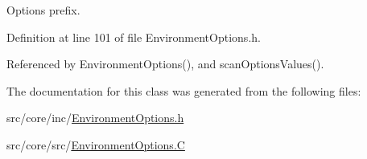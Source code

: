 Options prefix. 



Definition at line 101 of file Environment\-Options.\-h.



Referenced by Environment\-Options(), and scan\-Options\-Values().



The documentation for this class was generated from the following files\-:\begin{DoxyCompactItemize}
\item 
src/core/inc/\hyperlink{_environment_options_8h}{Environment\-Options.\-h}\item 
src/core/src/\hyperlink{_environment_options_8_c}{Environment\-Options.\-C}\end{DoxyCompactItemize}
